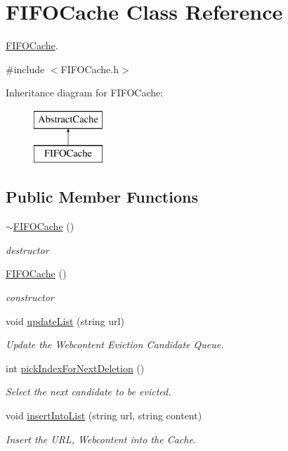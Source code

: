 \hypertarget{classFIFOCache}{\section{\-F\-I\-F\-O\-Cache \-Class \-Reference}
\label{classFIFOCache}
}


\hyperlink{classFIFOCache}{\-F\-I\-F\-O\-Cache}.  




{\ttfamily \#include $<$\-F\-I\-F\-O\-Cache.\-h$>$}

\-Inheritance diagram for \-F\-I\-F\-O\-Cache\-:\begin{figure}[H]
\begin{center}
\leavevmode
\includegraphics[height=2.000000cm]{classFIFOCache}
\end{center}
\end{figure}
\subsection*{\-Public \-Member \-Functions}
\begin{DoxyCompactItemize}
\item 
\hyperlink{classFIFOCache_a1ae7ca5adab1d06c341510f1f2fee299}{$\sim$\-F\-I\-F\-O\-Cache} ()
\begin{DoxyCompactList}\small\item\em destructor \end{DoxyCompactList}\item 
\hyperlink{classFIFOCache_a12486ada6ceb70c77f3cd4f40f295928}{\-F\-I\-F\-O\-Cache} ()
\begin{DoxyCompactList}\small\item\em constructor \end{DoxyCompactList}\item 
void \hyperlink{classFIFOCache_a73b7632a308ed4813d8c7e03cf597d47}{update\-List} (string url)
\begin{DoxyCompactList}\small\item\em \-Update the \-Webcontent \-Eviction \-Candidate \-Queue. \end{DoxyCompactList}\item 
int \hyperlink{classFIFOCache_a16f6449563e0e83af7069406a14089e9}{pick\-Index\-For\-Next\-Deletion} ()
\begin{DoxyCompactList}\small\item\em \-Select the next candidate to be evicted. \end{DoxyCompactList}\item 
void \hyperlink{classFIFOCache_ae1255739ccdb46db5a3c5bb9cbc3d868}{insert\-Into\-List} (string url, string content)
\begin{DoxyCompactList}\small\item\em \-Insert the \-U\-R\-L, \-Webcontent into the \-Cache. \end{DoxyCompactList}\end{DoxyCompactItemize}


